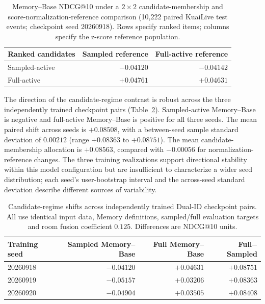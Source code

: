 \begin{table}[t]
\centering
\caption{Memory--Base NDCG@10 under a $2\times2$ candidate-membership and score-normalization-reference comparison (10,222 paired KuaiLive test events; checkpoint seed 20260918). Rows specify ranked items; columns specify the z-score reference population.}
\label{tab:results-factorial}
\footnotesize
\setlength{\tabcolsep}{6pt}
\begin{tabular}{@{}lrr@{}}
\toprule
Ranked candidates & Sampled reference & Full-active reference \\
\midrule
Sampled-active & $-0.04120$ & $-0.04142$ \\
Full-active & $+0.04761$ & $+0.04631$ \\
\bottomrule
\end{tabular}
\end{table}

The direction of the candidate-regime contrast is robust across the three independently trained checkpoint pairs (Table~\ref{tab:results-seeds}). Sampled-active Memory--Base is negative and full-active Memory--Base is positive for all three seeds. The mean paired shift across seeds is $+0.08508$, with a between-seed sample standard deviation of $0.00212$ (range $+0.08363$ to $+0.08751$). The mean candidate-membership allocation is $+0.08563$, compared with $-0.00056$ for normalization-reference changes. The three training realizations support directional stability within this model configuration but are insufficient to characterize a wider seed distribution; each seed's user-bootstrap interval and the across-seed standard deviation describe different sources of variability.

\begin{table}[t]
\centering
\caption{Candidate-regime shifts across independently trained Dual-ID checkpoint pairs. All use identical input data, Memory definitions, sampled/full evaluation targets and room fusion coefficient $0.125$. Differences are NDCG@10 units.}
\label{tab:results-seeds}
\footnotesize
\setlength{\tabcolsep}{6pt}
\begin{tabular}{@{}lrrr@{}}
\toprule
Training seed & Sampled Memory--Base & Full Memory--Base & Full$-$Sampled \\
\midrule
20260918 & $-0.04120$ & $+0.04631$ & $+0.08751$ \\
20260919 & $-0.05157$ & $+0.03206$ & $+0.08363$ \\
20260920 & $-0.04904$ & $+0.03505$ & $+0.08408$ \\
\bottomrule
\end{tabular}
\end{table}

